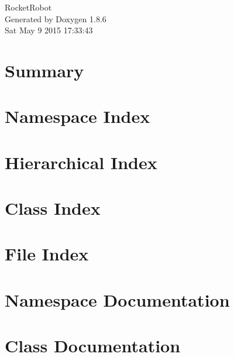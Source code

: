 \documentclass[twoside]{book}
\newcommand{\clearemptydoublepage}{%
  \newpage{\pagestyle{empty}\cleardoublepage}%
}
\begin{document}
\hypersetup{pageanchor=false}
\begin{titlepage}
\vspace*{7cm}
\begin{center}%
{\Large Rocket\-Robot }\\
\vspace*{1cm}
{\large Generated by Doxygen 1.8.6}\\
\vspace*{0.5cm}
{\small Sat May 9 2015 17:33:43}\\
\end{center}
\end{titlepage}
\clearemptydoublepage
\tableofcontents
\clearemptydoublepage
{}
\hypersetup{pageanchor=true}

\chapter{Summary}
\label{index}\hypertarget{index}{}
\chapter{Namespace Index}

\chapter{Hierarchical Index}

\chapter{Class Index}

\chapter{File Index}

\chapter{Namespace Documentation}



\chapter{Class Documentation}



















\end{document}
